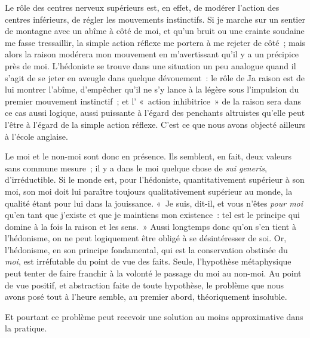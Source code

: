 \documentclass[french,twoside]{book} %
\begin{document}
Le rôle des centres nerveux supérieurs est, en effet, de modérer l’action des centres inférieurs, de régler les mouvements instinctifs. Si je marche sur un sentier de montagne avec un abîme à côté de moi, et qu’un bruit ou une crainte soudaine me fasse tressaillir, la simple action réflexe me portera à me rejeter de côté ; mais alors la raison modérera mon mouvement en m’avertissant qu’il y a un précipice près de moi. L’hédoniste se trouve dans une situation un peu analogue quand il s’agit de se jeter en aveugle dans quelque dévouement : le rôle de Ja raison est de lui montrer l’abîme, d’empêcher qu’il ne s’y lance à la légère sous l’impulsion du premier mouvement instinctif ; et l’ « action inhibitrice » de la raison sera dans ce cas aussi logique, aussi puissante à l’égard des penchants altruistes qu’elle peut l’être à l’égard de la simple action réflexe. C’est ce que nous avons objecté ailleurs à l’école anglaise.\par
Le moi et le non-moi sont donc en présence. Ils semblent, en fait, deux valeurs sans commune mesure ; il y a dans le moi quelque chose de \emph{sui generis}, d’irréductible. Si le monde est, pour l’hédoniste, quantitativement supérieur à son moi, son moi doit lui paraître toujours qualitativement supérieur au monde, la qualité étant pour lui dans la jouissance. « Je suis, dit-il, et vous n’êtes \emph{pour moi} qu’en tant que j’existe et que je maintiens mon existence : tel est le principe qui domine à la fois la raison et les sens. » Aussi longtemps donc qu’on s’en tient à l’hédonisme, on ne peut logiquement être obligé à se désintéresser de soi. Or, l’hédonisme, en son principe fondamental, qui est la conservation obstinée du \emph{moi}, est irréfutable du point de vue des faits. Seule, l’hypothèse métaphysique peut tenter de faire franchir à la volonté le passage du moi au non-moi. Au point de vue positif, et abstraction faite de toute hypothèse, le problème que nous avons posé tout à l’heure semble, au premier abord, théoriquement insoluble.\par
Et pourtant ce problème peut recevoir une solution au moins approximative dans la pratique.
\end{document}
